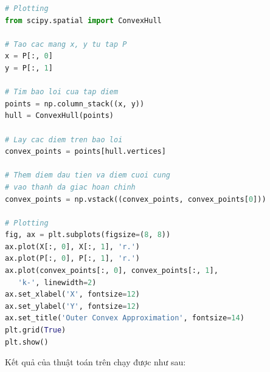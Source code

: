 \documentclass[12pt,a4paper,openany,oneside]{report}
\begin{document}
\begin{lstlisting}[language=Python, caption={Mô tả mã nguồn Python}, label={lst:python-code}]
# Plotting
from scipy.spatial import ConvexHull

# Tao cac mang x, y tu tap P
x = P[:, 0]
y = P[:, 1]

# Tim bao loi cua tap diem
points = np.column_stack((x, y))
hull = ConvexHull(points)

# Lay cac diem tren bao loi
convex_points = points[hull.vertices]

# Them diem dau tien va diem cuoi cung
# vao thanh da giac hoan chinh
convex_points = np.vstack((convex_points, convex_points[0]))

# Plotting
fig, ax = plt.subplots(figsize=(8, 8))
ax.plot(X[:, 0], X[:, 1], 'r.')
ax.plot(P[:, 0], P[:, 1], 'r.')
ax.plot(convex_points[:, 0], convex_points[:, 1],
   'k-', linewidth=2)
ax.set_xlabel('X', fontsize=12)
ax.set_ylabel('Y', fontsize=12)
ax.set_title('Outer Convex Approximation', fontsize=14)
plt.grid(True)
plt.show()
\end{lstlisting}


Kết quả của thuật toán trên chạy được như sau:
\end{document}
